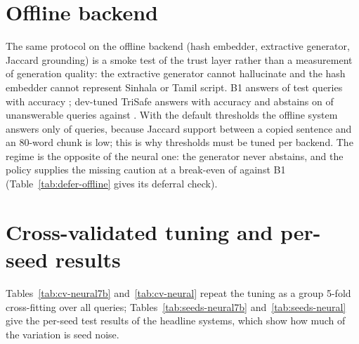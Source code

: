 \section{Offline backend}
The same protocol on the offline backend (hash embedder, extractive generator, Jaccard grounding) is a smoke test of the trust layer rather than a measurement of generation quality: the extractive generator cannot hallucinate and the hash embedder cannot represent Sinhala or Tamil script. B1 answers \OBoneAns{} of test queries with accuracy \OBoneAcc; dev-tuned TriSafe answers \OTunAns{} with accuracy \OTunAcc{} and abstains on \OTunUnans{} of unanswerable queries against \OBoneUnans. With the default thresholds the offline system answers only \ODefAns{} of queries, because Jaccard support between a copied sentence and an 80-word chunk is low; this is why thresholds must be tuned per backend. The regime is the opposite of the neural one: the generator never abstains, and the policy supplies the missing caution at a break-even of \OTunBreakEven{} against B1 (Table~\ref{tab:defer-offline} gives its deferral check).








\section{Cross-validated tuning and per-seed results}
Tables~\ref{tab:cv-neural7b} and~\ref{tab:cv-neural} repeat the tuning as a group 5-fold cross-fitting over all \Lnq{} queries; Tables~\ref{tab:seeds-neural7b} and~\ref{tab:seeds-neural} give the per-seed test results of the headline systems, which show how much of the variation is seed noise.




